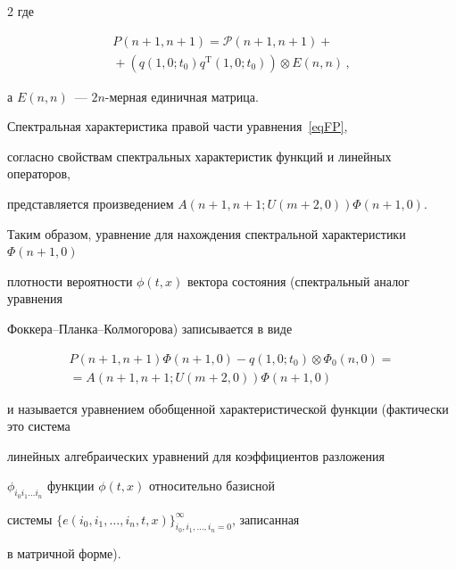 \begin{multicols}{2}
где


\begin{multline}


\label{eqDefP}


  P(n+1,n+1) = \mathcal{P}(n+1,n+1) +{}\\


  {}+ \left( q(1,0;t_0)  q^\mathrm{T}(1,0;t_0) \right) \otimes E(n,n)\,,


\end{multline}


а ${E(n,n)}$~--- $2n$-мер\-ная единичная мат\-рица.


\pagebreak





Спектральная характеристика правой час\-ти уравнения~\eqref{eqFP}, 


согласно свойствам спект\-раль\-ных характеристик функций и линейных операторов, 


представляется произведением ${A(n+1,n+1; U(m+2,0)) \Phi(n+1,0)}$.





Таким образом, уравнение для нахождения спектральной характеристики ${\Phi(n+1,0)}$ 


плот\-ности вероятности $\phi(t,x)$ вектора состояния (спект\-раль\-ный аналог уравнения 


Фок\-ке\-ра--План\-ка--Кол\-мо\-го\-ро\-ва) записывается в виде


\begin{multline}


\label{eqOHF}


  P(n+1,n+1)  \Phi(n+1,0) - q(1,0;t_0) \otimes \Phi_0(n,0) = {}\\


{}  = A(n+1,n+1; U(m+2,0))  \Phi(n+1,0)


\end{multline}


и называется уравнением обобщенной характеристической функции (фактически это сис\-те\-ма 


линейных алгебраических уравнений для коэффициентов разложения 


$\phi_{i_0 i_1 \dots i_n}$ функции $\phi(t,x)$ относительно базисной 


сис\-те\-мы ${\{e(i_0,i_1,\dots,i_n,t,x)\}_{i_0,i_1,\dots,i_n = 0}^\infty}$, записанная 


в мат\-рич\-ной форме).






\end{multicols}

